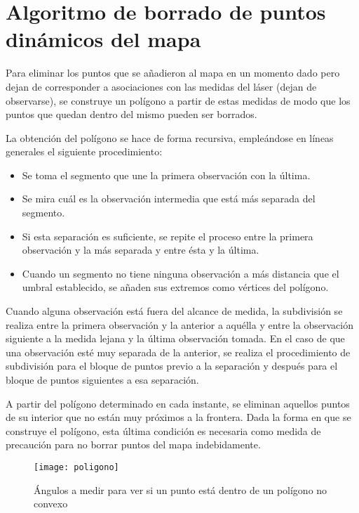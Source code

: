 \section{Algoritmo de borrado de puntos dinámicos del mapa} \label{poligono}
Para eliminar los puntos que se añadieron al mapa en un momento dado pero dejan de corresponder a asociaciones con las medidas del láser (dejan de observarse), se construye un polígono a partir de estas medidas de modo que los puntos que quedan dentro del mismo pueden ser borrados.

La obtención del polígono se hace de forma recursiva, empleándose en líneas generales el siguiente procedimiento:
\begin{itemize}
  \item Se toma el segmento que une la primera observación con la última.
  \item Se mira cuál es la observación intermedia que está más separada del segmento.
  \item Si esta separación es suficiente, se repite el proceso entre la primera observación y la más separada y entre ésta y la última.
  \item Cuando un segmento no tiene ninguna observación a más distancia que el umbral establecido, se añaden sus extremos como vértices del polígono.
\end{itemize}

Cuando alguna observación está fuera del alcance de medida, la subdivisión se realiza entre la primera observación y la anterior a aquélla y entre la observación siguiente a la medida lejana y la última observación tomada. En el caso de que una observación esté muy separada de la anterior, se realiza el procedimiento de subdivisión para el bloque de puntos previo a la separación y después para el bloque de puntos siguientes a esa separación.

A partir del polígono determinado en cada instante, se eliminan aquellos puntos de su interior que no están muy próximos a la frontera. Dada la forma en que se construye el polígono, esta última condición es necesaria como medida de precaución para no borrar puntos del mapa indebidamente.

\begin{figure}[h]
  \centering\texttt{[image: poligono]}\\
  \caption{ Ángulos a medir para ver si un punto está dentro de un polígono no convexo}\label{fg:poligono}
\end{figure}


